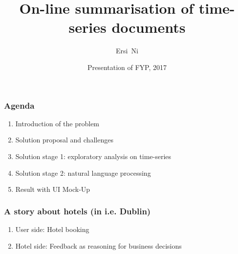 \documentclass[xetex,mathserif,serif]{beamer}
\begin{document}
\title[Crisis] %
{On-line summarisation of time-series documents}

\author %
{Ersi~Ni}
\date %
{Presentation of FYP, 2017}

\frame{\titlepage}
\begin{frame}
	\frametitle{Agenda}
	\begin{enumerate}
		\item Introduction of the problem
		\item Solution proposal and challenges
		\item Solution stage 1: exploratory analysis on time-series
		\item Solution stage 2: natural language processing
		\item Result with UI Mock-Up
	\end{enumerate}
\end{frame}
\begin{frame}
	\frametitle{A story about hotels (in i.e. Dublin)}
	\begin{enumerate}
		\item User side: Hotel booking

		\item Hotel side: Feedback as reasoning for business decisions

	\end{enumerate}
	

	
\end{frame}
\end{document}
